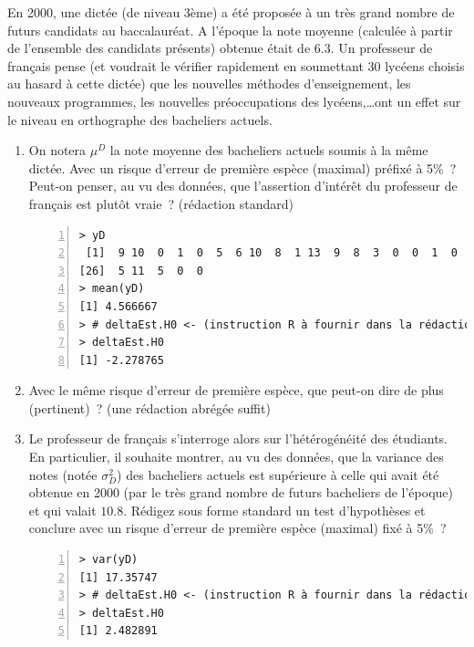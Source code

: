 \documentclass[10pt]{report}
\begin{document}
\begin{exercice}[Dictée]

En 2000, une  dictée (de niveau 3ème) a été proposée à un très grand nombre de futurs candidats au baccalauréat. A l'époque la note moyenne (calculée à partir de l'ensemble des candidats présents) obtenue était de $6.3$. Un professeur de français pense (et voudrait le vérifier rapidement en soumettant 30 lycéens choisis au hasard à cette dictée) que les nouvelles méthodes d'enseignement, les nouveaux programmes, les nouvelles préoccupations  des lycéens,\ldots ont un effet sur le niveau en orthographe des bacheliers actuels.  \\


\begin{enumerate}
\item On notera $\mu^D$ la note moyenne des bacheliers actuels soumis à la même dictée. Avec un risque d'erreur de première espèce (maximal) préfixé à 5\%~? Peut-on penser, au vu des données, que l'assertion d'intérêt du professeur de français est plutôt vraie~? (rédaction standard)

\IndicR
\begin{Verbatim}[frame=leftline,fontfamily=tt,fontshape=n,numbers=left]
> yD
 [1]  9 10  0  1  0  5  6 10  8  1 13  9  8  3  0  0  1  0  0  0  6  9  6  8  3
[26]  5 11  5  0  0
> mean(yD)
[1] 4.566667
> # deltaEst.H0 <- (instruction R à fournir dans la rédaction)
> deltaEst.H0
[1] -2.278765
\end{Verbatim}

 




\item Avec le même risque d'erreur de première espèce, que peut-on dire de plus (pertinent)~? (une rédaction abrégée suffit)

 


\item Le professeur de français s'interroge alors sur l'hétérogénéité des étudiants. En particulier, il souhaite montrer, au vu des données, que la variance des notes (notée $\sigma^2_D$) des bacheliers actuels est supérieure à celle qui avait été obtenue en 2000 (par le très grand nombre de futurs bacheliers de l'époque) et qui valait $10.8$. Rédigez sous forme standard un test d'hypothèses et conclure avec un risque d'erreur de première espèce (maximal) fixé à 5\%~? 


\IndicR
\begin{Verbatim}[frame=leftline,fontfamily=tt,fontshape=n,numbers=left]
> var(yD)
[1] 17.35747
> # deltaEst.H0 <- (instruction R à fournir dans la rédaction)
> deltaEst.H0
[1] 2.482891
\end{Verbatim}






\end{enumerate}
\end{exercice}
\end{document}
